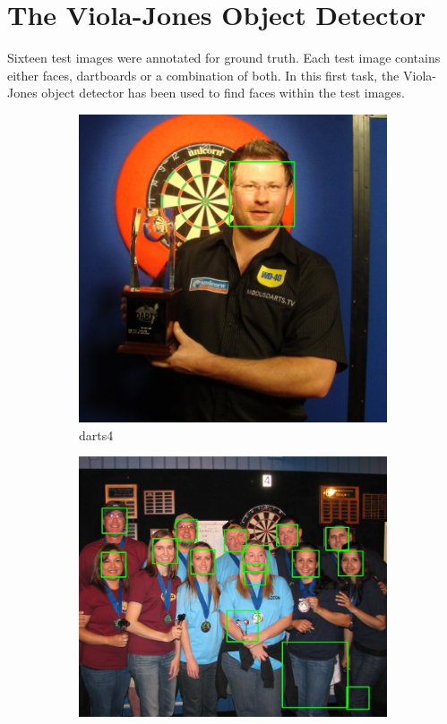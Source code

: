 \documentclass[conference]{IEEEtran}
\begin{document}
\section{The Viola-Jones Object Detector}
\vspace{-0.15cm}
Sixteen test images were annotated for ground truth. Each test image contains either faces, dartboards or a combination of both. In this first task, the Viola-Jones object detector has been used to find faces within the test images. 
\begin{figure}[htb]
\centering
\begin{subfigure}{.5\linewidth}
  \centering
  \includegraphics[width=.9\linewidth]{images/detected0.jpg}
  \caption{darts4}
  \label{fig:sub1}
\end{subfigure}%
\begin{subfigure}{.5\linewidth}
  \centering
  \vspace{0.6cm}
  \includegraphics[width=.9\linewidth]{images/detected1.jpg}

\end{subfigure}
\end{figure}
\end{document}
